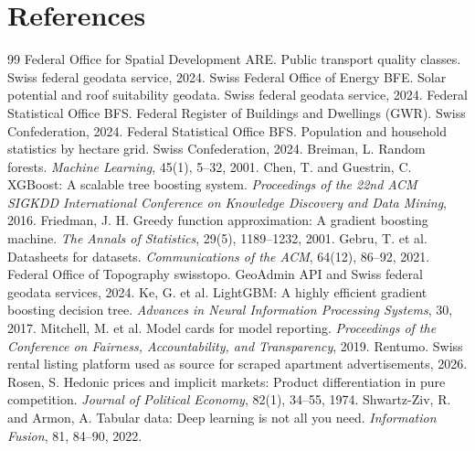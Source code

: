 \documentclass[11pt,a4paper]{article}
\begin{document}
\section{References}
\label{sec:references}


\begin{thebibliography}{99}
 Federal Office for Spatial Development ARE. Public transport quality classes. Swiss federal geodata service, 2024.
 Swiss Federal Office of Energy BFE. Solar potential and roof suitability geodata. Swiss federal geodata service, 2024.
 Federal Statistical Office BFS. Federal Register of Buildings and Dwellings (GWR). Swiss Confederation, 2024.
 Federal Statistical Office BFS. Population and household statistics by hectare grid. Swiss Confederation, 2024.
 Breiman, L. Random forests. \emph{Machine Learning}, 45(1), 5--32, 2001.
 Chen, T. and Guestrin, C. XGBoost: A scalable tree boosting system. \emph{Proceedings of the 22nd ACM SIGKDD International Conference on Knowledge Discovery and Data Mining}, 2016.
 Friedman, J. H. Greedy function approximation: A gradient boosting machine. \emph{The Annals of Statistics}, 29(5), 1189--1232, 2001.
 Gebru, T. et al. Datasheets for datasets. \emph{Communications of the ACM}, 64(12), 86--92, 2021.
 Federal Office of Topography swisstopo. GeoAdmin API and Swiss federal geodata services, 2024.
 Ke, G. et al. LightGBM: A highly efficient gradient boosting decision tree. \emph{Advances in Neural Information Processing Systems}, 30, 2017.
 Mitchell, M. et al. Model cards for model reporting. \emph{Proceedings of the Conference on Fairness, Accountability, and Transparency}, 2019.
 Rentumo. Swiss rental listing platform used as source for scraped apartment advertisements, 2026.
 Rosen, S. Hedonic prices and implicit markets: Product differentiation in pure competition. \emph{Journal of Political Economy}, 82(1), 34--55, 1974.
 Shwartz-Ziv, R. and Armon, A. Tabular data: Deep learning is not all you need. \emph{Information Fusion}, 81, 84--90, 2022.
\end{thebibliography}
\end{document}
